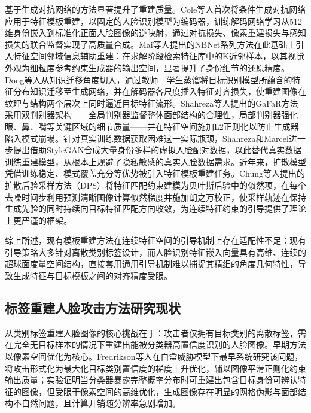 基于生成对抗网络的方法显著提升了重建质量\cite{XXCN202201014,DATE202305002}。Cole等人\cite{cole2017synthesizing}首次将条件生成对抗网络应用于特征模板重建，以固定的人脸识别模型为编码器，训练解码网络学习从512维身份嵌入到标准化正面人脸图像的逆映射，通过对抗损失、像素重建损失与感知损失的联合监督实现了高质量合成。Mai等人\cite{mai2018reconstruction}提出的NBNet系列方法在此基础上引入特征空间邻域信息辅助重建：在求解阶段检索特征库中的K近邻样本，以其视觉外观为细粒度参考约束生成器的输出空间，显著提升了身份细节的还原精度。Dong等人\cite{dong2021towards,dong2023reconstruct}从知识迁移角度切入，通过教师—学生蒸馏将目标识别模型所蕴含的特征分布知识迁移至生成网络，并在解码器各尺度插入特征对齐损失，使重建图像在纹理与结构两个层次上同时逼近目标特征流形。Shahreza等人\cite{shahreza2023template}提出的GaFaR方法采用双判别器架构——全局判别器监督整体面部结构的合理性，局部判别器强化眼、鼻、嘴等关键区域的细节质量——并在特征空间施加L2正则化以防止生成器陷入模式崩塌。针对真实训练数据获取困难这一实际瓶颈，Shahreza和Marcel\cite{shahreza2024template}进一步提出借助StyleGAN合成大量身份多样的虚拟人脸配对数据，以此替代真实数据训练重建模型，从根本上规避了隐私敏感的真实人脸数据需求。近年来，扩散模型凭借训练稳定、模式覆盖充分等优势被引入特征模板重建任务。Chung等人\cite{chung2022diffusion}提出的扩散后验采样方法（DPS）将特征匹配约束建模为贝叶斯后验中的似然项，在每个去噪时间步利用预测清晰图像计算似然梯度并施加朗之万校正，使采样轨迹在保持生成先验的同时持续向目标特征匹配方向收敛，为连续特征约束的引导提供了理论上更严谨的框架。

综上所述，现有模板重建方法在连续特征空间的引导机制上存在适配性不足：现有引导策略大多针对离散类别标签设计，而人脸识别特征嵌入向量具有高维、连续的超球面度量空间结构，直接套用通用引导机制难以捕捉其精细的角度几何特性，导致生成特征与目标模板之间的对齐精度受限。

\subsection{标签重建人脸攻击方法研究现状}

从类别标签重建人脸图像的核心挑战在于：攻击者仅拥有目标类别的离散标签，需在完全无目标样本的情况下重建出能被分类器高置信度识别的人脸图像。早期方法以像素空间优化为核心。Fredrikson等人\cite{fredrikson2015model}在白盒威胁模型下最早系统研究该问题，将攻击形式化为最大化目标类别置信度的梯度上升优化，辅以图像平滑正则化约束输出质量；实验证明当分类器暴露完整概率分布时可重建出包含目标身份可辨认特征的图像，但受限于像素空间的高维优化，生成图像存在明显的网格伪影与面部结构不自然问题，且计算开销随分辨率急剧增加。

